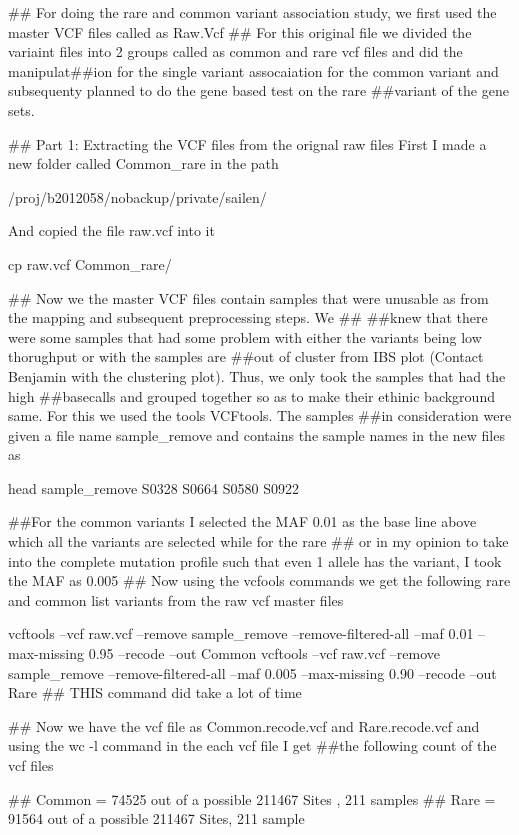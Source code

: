 ## For doing the rare and common variant association study, we first used the master VCF files called as Raw.Vcf 
## For this original file we divided the variaint files into 2 groups called as common and rare vcf files and did the manipulat##ion for the single variant assocaiation for the common variant and subsequenty planned to do the gene based test on the rare ##variant of the gene sets. 

## Part 1: Extracting the VCF files from the orignal raw files
First I made a new folder called Common_rare in the path 

/proj/b2012058/nobackup/private/sailen/

And copied the file raw.vcf into it

cp raw.vcf Common_rare/

## Now we the master VCF files contain samples that were unusable as from the mapping and subsequent preprocessing steps. We ## ##knew that there were some samples that had some problem with either the variants being low thorughput or with the samples are ##out of cluster from IBS plot (Contact Benjamin with the clustering plot). Thus, we only took the samples that had the high ##basecalls and grouped together so as to make their ethinic background same. For this we used the tools VCFtools. The samples ##in consideration were given a file name sample_remove and contains the sample names in the new files as
 
head sample_remove
S0328
S0664
S0580
S0922

##For the common variants I selected the MAF 0.01 as the base line above which all the variants are selected while for the rare ## or in my opinion to take into the complete mutation profile such that even 1 allele has the variant, I took the MAF as 0.005 ## Now using the vcfools commands we get the following rare and common list variants from the raw vcf master files

 vcftools --vcf raw.vcf --remove sample_remove --remove-filtered-all --maf 0.01 --max-missing 0.95 --recode --out Common
 vcftools --vcf raw.vcf --remove sample_remove --remove-filtered-all --maf 0.005 --max-missing 0.90 --recode --out Rare
 ## THIS command did take a lot of time 
 
 ## Now we have the vcf file as Common.recode.vcf and Rare.recode.vcf and using the wc -l command in the each vcf file I get ##the following count of the vcf files

## Common = 74525 out of a possible 211467 Sites , 211 samples
## Rare =  91564 out of a possible 211467 Sites, 211 sample

